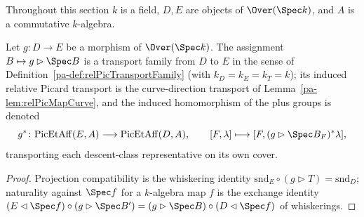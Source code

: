 Throughout this section \(k\) is a field, \(D, E\) are objects of \(\Over(\Spec k)\), and
\(A\) is a commutative \(k\)-algebra.

\begin{definition}
  \label{pa-def:PicEtAff_curveMap}
  \leanok

  Let \(g \colon D \to E\) be a morphism of \(\Over(\Spec k)\). The assignment
  \(B \mapsto g \rhd \Spec B\) is a transport family from \(D\) to \(E\) in the sense of
  Definition~\ref{pa-def:relPicTransportFamily} (with \(k_D = k_E = k_T = k\)); its induced
  relative Picard transport is the curve-direction transport of
  Lemma~\ref{pa-lem:relPicMapCurve}, and the induced homomorphism of the plus groups is
  denoted
  \[
    g^{*} \colon \mathrm{PicEtAff}(E, A) \longrightarrow \mathrm{PicEtAff}(D, A),
    \qquad [F, \lambda] \longmapsto [F, (g \rhd \Spec B_F)^{*}\lambda],
  \]
  transporting each descent-class representative on its own cover.
\end{definition}
\begin{proof}
  \leanok
  Projection compatibility is the whiskering identity
  \(\mathrm{snd}_E \circ (g \rhd T) = \mathrm{snd}_D\); naturality against \(\Spec f\) for
  a \(k\)-algebra map \(f\) is the exchange identity
  \((E \lhd \Spec f) \circ (g \rhd \Spec B') = (g \rhd \Spec B) \circ (D \lhd \Spec f)\)
  of whiskerings.
\end{proof}

